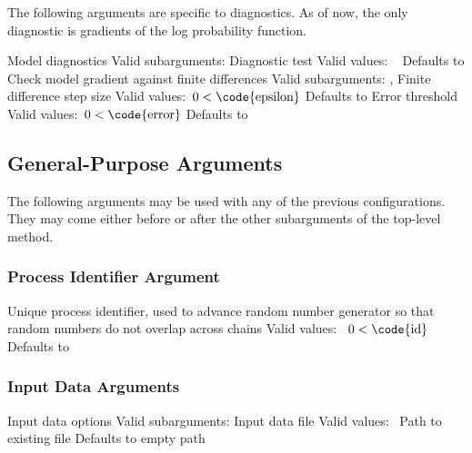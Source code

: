 The following arguments are specific to diagnostics.  As of now, the
only diagnostic is gradients of the log probability function.

\begin{description}

    {Model diagnostics}
    {Valid subarguments: }
%
      {Diagnostic test}
      {Valid values: \  }
      {Defaults to }
%
        {Check model gradient against finite differences}
        {Valid subarguments: , }
%
        {Finite difference step size}
	    {Valid values:\ $0 < \mbox{\code{epsilon}}$}
	    {Defaults to }
%
       {Error threshold}
	   {Valid values:\ $0 < \mbox{\code{error}}$}
	   {Defaults to }
%
\end{description}

\subsection{General-Purpose Arguments}

The following arguments may be used with any of the previous
configurations.   They may come either before or after the other
subarguments of the top-level method.

\subsubsection{Process Identifier Argument}

\begin{description}
  {Unique process identifier, used to advance random number generator so that random numbers do not overlap across chains}
  {Valid values: \  $0 < \mbox{\code{id}}$}
  {Defaults to }
%
\end{description}

\subsubsection{Input Data Arguments}

\begin{description}

  {Input data options}
  {Valid subarguments: }
%
    {Input data file}
    {Valid values: \  Path to existing file}
    {Defaults to empty path}
%
\end{description}

